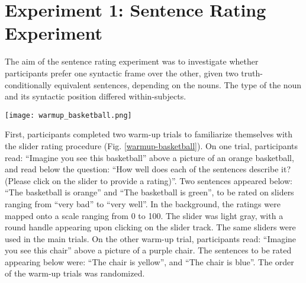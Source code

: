 \section{Experiment 1: Sentence Rating Experiment}


The aim of the sentence rating experiment was to investigate whether participants prefer one syntactic frame over the other, given two truth-conditionally equivalent sentences, depending on the nouns. The type of the noun and its syntactic position differed within-subjects.

\begin{figure*}[t]
	\begin{center}
		\texttt{[image: warmup\_basketball.png]}
	\end{center}
	\caption{Example view of the sentence rating warm-up trial involving a basketball. }
	\label{warmup-basketball}
\end{figure*}
First, participants completed two warm-up trials to familiarize themselves with the slider rating procedure (Fig. \ref{warmup-basketball}). On one trial, participants read: “Imagine you see this basketball” above a picture of an orange basketball, and read below the question: “How well does each of the sentences describe it? (Please click on the slider to provide a rating)”. Two sentences appeared below: “The basketball is orange” and “The basketball is green”, to be rated on sliders ranging from “very bad” to “very well”. In the background, the ratings were mapped onto a scale ranging from 0 to 100. The slider was light gray, with a round handle appearing upon clicking on the slider track. The same sliders were used in the main trials. On the other warm-up trial, participants read: “Imagine you see this chair” above a picture of a purple chair. The sentences to be rated appearing below were: “The chair is yellow”, and “The chair is blue”. The order of the warm-up trials was randomized.    

